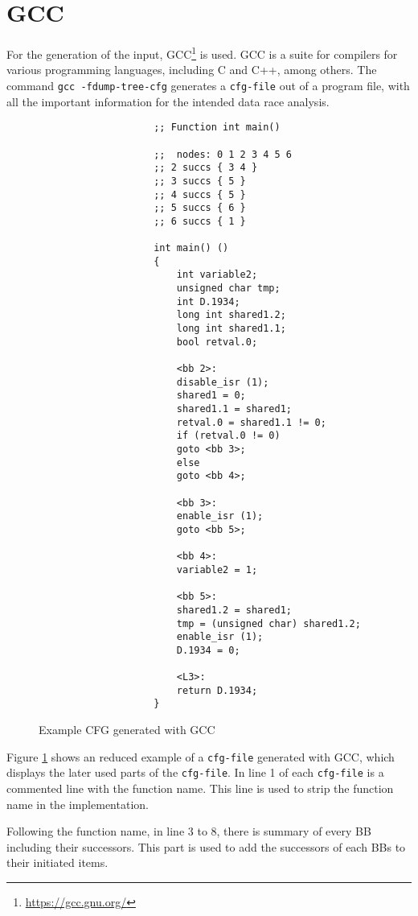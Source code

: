 \documentclass[
fancyheadings, %
%
%
]{stsreprt}
\begin{document}
{	\section{\acl{GCC}}
		For the generation of the input, \ac{GCC}\footnote{\href{https://gcc.gnu.org/}{https://gcc.gnu.org/}} is used. \Ac{GCC} is a suite for compilers for various programming languages, including C and C++, among others. The command \texttt{gcc -fdump-tree-cfg} generates a \mbox{\texttt{cfg-file}} out of a program file, with all the important information for the intended data race analysis.
		\begin{figure}[H]
			\begin{adjustbox}{scale=1}
				\begin{lstlisting}
					;; Function int main()
					
					;;  nodes: 0 1 2 3 4 5 6
					;; 2 succs { 3 4 }
					;; 3 succs { 5 }
					;; 4 succs { 5 }
					;; 5 succs { 6 }
					;; 6 succs { 1 } 
					
					int main() ()
					{
						int variable2;
						unsigned char tmp;
						int D.1934;
						long int shared1.2;
						long int shared1.1;
						bool retval.0;
						
						<bb 2>:
						disable_isr (1);
						shared1 = 0;
						shared1.1 = shared1;
						retval.0 = shared1.1 != 0;
						if (retval.0 != 0)
						goto <bb 3>;
						else
						goto <bb 4>;
						
						<bb 3>:
						enable_isr (1);
						goto <bb 5>;
						
						<bb 4>:
						variable2 = 1;
						
						<bb 5>:
						shared1.2 = shared1;
						tmp = (unsigned char) shared1.2;
						enable_isr (1);
						D.1934 = 0;
						
						<L3>:
						return D.1934;
					}
				\end{lstlisting}
			\end{adjustbox}
			\caption{Example CFG generated with GCC}
			\label{fig:gcc}
		\end{figure}
		Figure \ref{fig:gcc} shows an reduced example of a \texttt{cfg-file} generated with \ac{GCC}, which displays the later used parts of the \texttt{cfg-file}.
		In line 1 of each \texttt{cfg-file} is a commented line with the function name. This line is used to strip the function name in the implementation.
		
		Following the function name, in line 3 to 8, there is summary of every \acl{BB} including their successors. This part is used to add the successors of each \aclp{BB} to their initiated items. 
		
}
\end{document}
